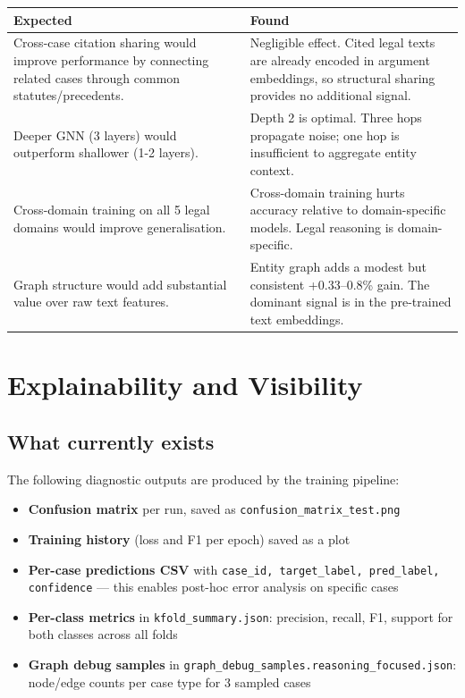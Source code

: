 \documentclass[12pt,a4paper]{article}
\begin{document}
\begin{center}
\begin{tabularx}{\textwidth}{>{\raggedright\arraybackslash}X >{\raggedright\arraybackslash}X}
\toprule
\textbf{Expected} & \textbf{Found} \\
\midrule
Cross-case citation sharing would improve performance by connecting related cases through common statutes/precedents. &
Negligible effect. Cited legal texts are already encoded in argument embeddings, so structural sharing provides no additional signal. \\
\addlinespace
Deeper GNN (3 layers) would outperform shallower (1-2 layers). &
Depth 2 is optimal. Three hops propagate noise; one hop is insufficient to aggregate entity context. \\
\addlinespace
Cross-domain training on all 5 legal domains would improve generalisation. &
Cross-domain training hurts accuracy relative to domain-specific models. Legal reasoning is domain-specific. \\
\addlinespace
Graph structure would add substantial value over raw text features. &
Entity graph adds a modest but consistent +0.33--0.8\% gain. The dominant signal is in the pre-trained text embeddings. \\
\bottomrule
\end{tabularx}
\end{center}

\section{Explainability and Visibility}

\subsection{What currently exists}

The following diagnostic outputs are produced by the training pipeline:
\begin{itemize}[noitemsep]
  \item \textbf{Confusion matrix} per run, saved as \texttt{confusion\_matrix\_test.png}
  \item \textbf{Training history} (loss and F1 per epoch) saved as a plot
  \item \textbf{Per-case predictions CSV} with \texttt{case\_id, target\_label, pred\_label, confidence} — this enables post-hoc error analysis on specific cases
  \item \textbf{Per-class metrics} in \texttt{kfold\_summary.json}: precision, recall, F1, support for both classes across all folds
  \item \textbf{Graph debug samples} in \texttt{graph\_debug\_samples.\allowbreak reasoning\_focused.json}: node/edge counts per case type for 3 sampled cases
\end{itemize}
\end{document}
